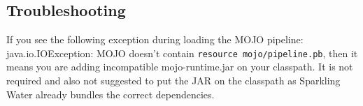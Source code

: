 \subsection{Troubleshooting}

If you see the following exception during loading the MOJO pipeline:\\
java.io.IOException: MOJO doesn't contain \texttt{resource mojo/pipeline.pb}, then it means you are adding
incompatible mojo-runtime.jar on your classpath. It is not required and also not suggested
to put the JAR on the classpath as Sparkling Water already bundles the correct dependencies.
